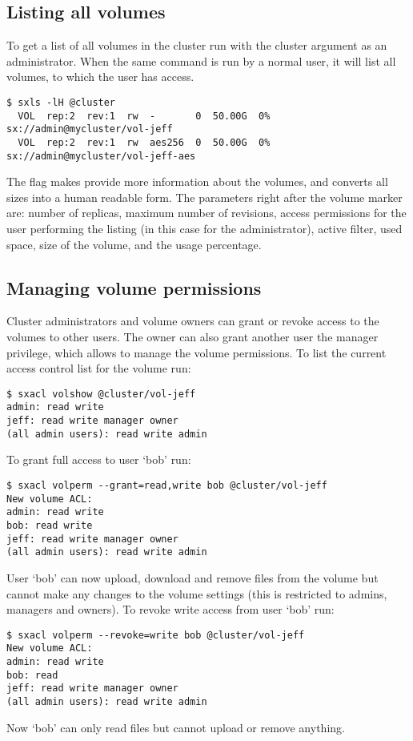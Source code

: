 \subsection{Listing all volumes}
To get a list of all volumes in the cluster run  with the cluster
argument as an administrator. When the same command is run by a normal user,
it will list all volumes, to which the user has access.
\begin{lstlisting}
$ sxls -lH @cluster
  VOL  rep:2  rev:1  rw  -       0  50.00G  0% sx://admin@mycluster/vol-jeff
  VOL  rep:2  rev:1  rw  aes256  0  50.00G  0% sx://admin@mycluster/vol-jeff-aes
\end{lstlisting}
The  flag makes  provide more information
about the volumes, and  converts all sizes into a human readable form.
The parameters right after the volume marker  are: number of replicas,
maximum number of revisions, access permissions for the user performing the
listing (in this case for the administrator), active filter, used space, size
of the volume, and the usage percentage.

\subsection{Managing volume permissions}
Cluster administrators and volume owners can grant or revoke access
to the volumes to other users. The owner can also grant another user
the manager privilege, which allows to manage the volume permissions.
To list the current access control list for the volume  run:
\begin{lstlisting}
$ sxacl volshow @cluster/vol-jeff
admin: read write
jeff: read write manager owner
(all admin users): read write admin
\end{lstlisting}
To grant full access to user `bob' run:
\begin{lstlisting}
$ sxacl volperm --grant=read,write bob @cluster/vol-jeff
New volume ACL:
admin: read write
bob: read write
jeff: read write manager owner
(all admin users): read write admin
\end{lstlisting}
User `bob' can now upload, download and remove files from the volume but cannot
make any changes to the volume settings (this is restricted to admins, managers
and owners). To revoke write access from user `bob' run:
\begin{lstlisting}
$ sxacl volperm --revoke=write bob @cluster/vol-jeff
New volume ACL:
admin: read write
bob: read
jeff: read write manager owner
(all admin users): read write admin
\end{lstlisting}
Now `bob' can only read files but cannot upload or remove anything.

